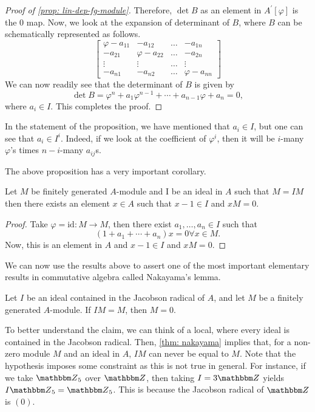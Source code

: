 \begin{proof}[Proof of \cref{prop: lin-dep-fg-module}]
   Therefore, $\operatorname{det} B$ as an element in $A^{\prime}[\varphi]$ is the 0 map. Now, we look at the expansion of determinant of $B$, where $B$ can be schematically represented as follows.
    $$
    \left[\begin{array}{cccc}
    \varphi-a_{11} & -a_{12} & \ldots & -a_{1 n} \\
    -a_{21} & \varphi-a_{22} & \ldots & -a_{2 n} \\
    \vdots & \vdots & \ldots & \vdots \\
    -a_{n 1} & -a_{n 2} & \ldots & \varphi-a_{n n}
    \end{array}\right]
    $$
    We can now readily see that the determinant of $B$ is given by
    $$
    \operatorname{det} B=\varphi^{n}+a_{1} \varphi^{n-1}+\cdots+a_{n-1} \varphi+a_{n}=0,
    $$
    where $a_{i} \in I$. This completes the proof.
\end{proof}
In the statement of the proposition, we have mentioned that $a_{i} \in I$, but one can see that $a_{i} \in I^{i}$. Indeed, if we look at the coefficient of $\varphi^{i}$, then it will be $i$-many $\varphi$'s times $n-i$-many $a_{i j}$s.

The above proposition has a very important corollary.
\begin{corollary}\label{cor: for-nakayama}
    Let $M$ be finitely generated $A$-module and I be an ideal in $A$ such that $M=I M$ then there exists an element $x \in A$ such that $x-1 \in I$ and $x M=0$.
\end{corollary} 
\begin{proof}
    Take $\varphi=\mathrm{id}: M \longrightarrow M$, then there exist $a_{1}, \ldots, a_{n} \in I$ such that
    $$
    \left(1+a_{1}+\cdots+a_{n}\right) x=0 \forall x \in M .
    $$
    Now, this is an element in $A$ and $x-1 \in I$ and $x M=0$.
\end{proof} 

We can now use the results above to assert one of the most important elementary results in commutative algebra called Nakayama's lemma.
\begin{theorem}\label{thm: nakayama-m=0}
    Let $I$ be an ideal contained in the Jacobson radical of $A$, and let $M$ be a finitely generated $A$-module. If $IM =M$, then $M=0$.
\end{theorem}

To better understand the claim, we can think of a local, where every ideal is contained in the Jacobson radical. Then, \cref{thm: nakayama} implies that, for a non-zero module $M$ and an ideal in $A$, $I M$ can never be equal to $M$. Note that the hypothesis imposes some constraint as this is not true in general. For instance, if we take ${\Z}_{5}$ over ${\Z}$, then taking $I = 3{\Z}$ yields $I{\Z}_{5} = {\Z}_{5}$. This is because the Jacobson radical of ${\Z}$ is $(0)$.

